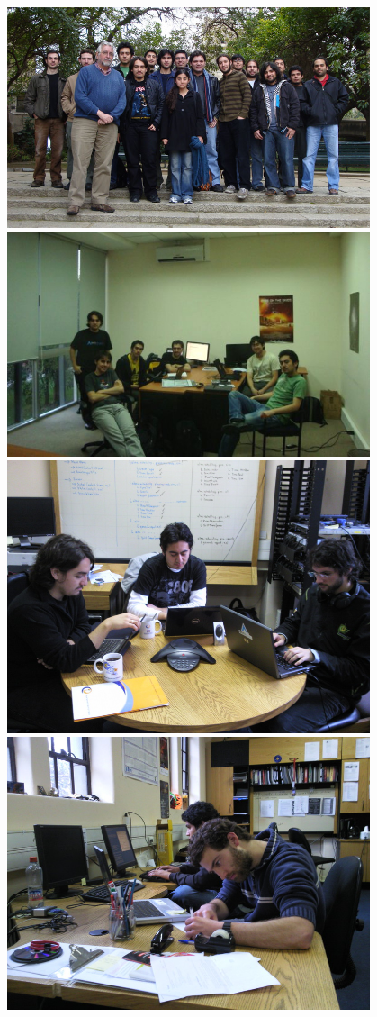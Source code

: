 \begin{center} 
\includegraphics[width=0.8\textwidth]{images/alma-utfsm-1}\\\vspace{1cm}
\includegraphics[width=0.8\textwidth]{images/alma-utfsm-2}\\
\includegraphics[width=0.8\textwidth]{images/lab_conference}\\\vspace{1cm}
\includegraphics[width=0.8\textwidth]{images/lab_working}\\

\end{center}
